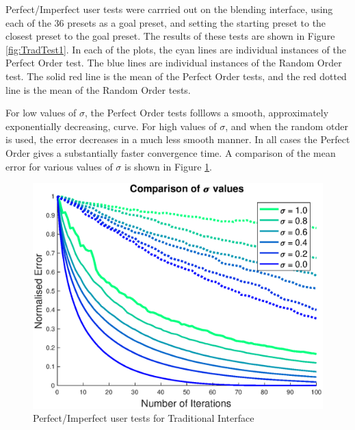 \documentclass[11pt, oneside]{report}   	%
\begin{document}
Perfect/Imperfect user tests were carrried out on the blending interface, using each of the 36 presets as a goal preset, and setting the starting preset to the closest preset to the goal preset. The results of these tests are shown in Figure \ref{fig:TradTest1}. In each of the plots, the cyan lines are individual instances of the Perfect Order test. The blue lines are individual instances of the Random Order test. The solid red line is the mean of the Perfect Order tests, and the red dotted line is the mean of the Random Order tests. 

For low values of $\sigma$, the Perfect Order tests folllows a smooth, approximately exponentially decreasing, curve. For high values of $\sigma$, and when the random otder is used, the error decreases in a much less smooth manner. In all cases the Perfect Order gives a substantially faster convergence time. A comparison of the mean error for various values of $\sigma$ is shown in Figure \ref{fig:TradTest2}. 
\begin{figure}
	\centering
	\includegraphics[width = \textwidth/2]{TradInterfaceTests2.eps}
	\caption{Perfect/Imperfect user tests for Traditional Interface}
	\label{fig:TradTest2}
	
	
	
\end{figure}
\end{document}
